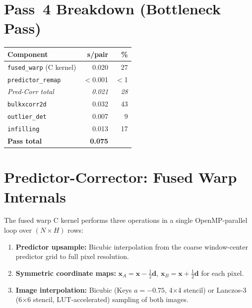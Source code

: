 \documentclass[10pt,a4paper,twocolumn]{article}
\begin{document}
\section{Pass~4 Breakdown (Bottleneck Pass)}

\begin{center}
\small
\begin{tabular}{@{}lrr@{}}
\toprule
\textbf{Component} & \textbf{s/pair} & \textbf{\%} \\
\midrule
\texttt{fused\_warp} (C kernel) & 0.020 & 27 \\
\texttt{predictor\_remap}       & $<$0.001 & $<$1 \\
\rowcolor{lightgray}
\textit{Pred-Corr total}        & \textit{0.021} & \textit{28} \\
\texttt{bulkxcorr2d}            & 0.032 & 43 \\
\texttt{outlier\_det}           & 0.007 & 9 \\
\texttt{infilling}              & 0.013 & 17 \\
\midrule
\textbf{Pass total}              & \textbf{0.075} & \\
\bottomrule
\end{tabular}
\end{center}

\section{Predictor-Corrector: Fused Warp Internals}

The fused warp C kernel performs three operations in a single OpenMP-parallel loop over $(N \times H)$ rows:

\begin{enumerate}[leftmargin=1.4em]
\item \textbf{Predictor upsample:} Bicubic interpolation from the coarse window-center predictor grid to full pixel resolution.
\item \textbf{Symmetric coordinate maps:} $\mathbf{x}_A = \mathbf{x} - \tfrac{1}{2}\mathbf{d}$, $\mathbf{x}_B = \mathbf{x} + \tfrac{1}{2}\mathbf{d}$ for each pixel.
\item \textbf{Image interpolation:} Bicubic (Keys $a=-0.75$, 4$\times$4 stencil) or Lanczos-3 (6$\times$6 stencil, LUT-accelerated) sampling of both images.
\end{enumerate}
\end{document}
